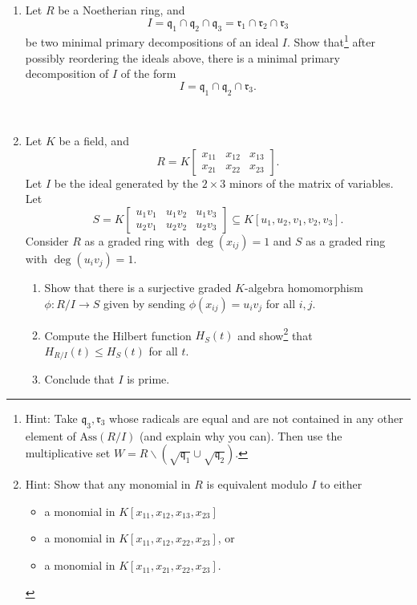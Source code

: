 \documentclass{amsart}[12pt]
\numberwithin{equation}{section}
\theoremstyle{plain} %
\theoremstyle{definition}
\theoremstyle{remark}
\begin{document}
\begin{enumerate}
\

\item Let $R$ be a Noetherian ring, and 
\[ I=\mathfrak{q}_1 \cap \mathfrak{q}_2 \cap \mathfrak{q}_3 = \mathfrak{r}_1 \cap \mathfrak{r}_2 \cap \mathfrak{r}_3\]
be two minimal primary decompositions of an ideal $I$.
Show that\footnote{Hint: Take $\mathfrak{q}_3, \mathfrak{r}_3$ whose radicals are equal and are not contained  in any other element of $\mathrm{Ass}(R/I)$ (and explain why you can). Then use the multiplicative set $W=R\smallsetminus (\sqrt{\mathfrak{q}_1} \cup \sqrt{\mathfrak{q}_2})$.} after possibly reordering the ideals above, there is a minimal primary decomposition of $I$ of the form
\[ I = \mathfrak{q}_1 \cap \mathfrak{q}_2 \cap \mathfrak{r}_3.\]

\




\item Let $K$ be a field, and 
\[R=K\begin{bmatrix} x_{11} & x_{12} & x_{13} \\ x_{21} & x_{22} & x_{23}\end{bmatrix}.\] Let $I$ be the ideal generated by the $2\times 3$ minors of  the matrix of variables.
Let \[S=K\begin{bmatrix} u_1 v_1 & u_1 v_2 & u_1 v_3 \\ u_2 v_1 & u_2 v_2 & u_2 v_3\end{bmatrix}\subseteq K[u_1,u_2,v_1,v_2,v_3].\] 
Consider $R$ as a graded ring with $\deg(x_{ij}) = 1$ and $S$ as a graded ring with $\deg(u_i v_j) =1$.
\begin{enumerate}
\item Show that there is a surjective graded $K$-algebra homomorphism $\phi:R/I \to S$ given by sending $\phi(x_{ij}) = u_i v_j$ for all $i,j$.
\item Compute the Hilbert function $H_S(t)$ and show\footnote{Hint: Show that any monomial in $R$ is equivalent modulo $I$ to either 
\begin{itemize} 
\item a monomial in $K[x_{11},x_{12},x_{13},x_{23}]$
\item a monomial in $K[x_{11},x_{12},x_{22},x_{23}]$, or
\item a monomial in $K[x_{11},x_{21},x_{22},x_{23}]$.
\end{itemize}}
that $H_{R/I}(t)\leq H_S(t)$ for all $t$.
\item Conclude that $I$ is prime.
\end{enumerate}


\end{enumerate}
\end{document}
